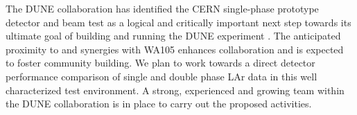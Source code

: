 The DUNE collaboration has identified the CERN single-phase prototype detector and beam test as a logical and critically important next
step towards its ultimate goal of building and running the DUNE experiment \cite{dunecdr}. The anticipated proximity to and synergies with WA105 enhances collaboration and is expected to foster community building. We plan to work towards a direct detector performance comparison of single and double phase LAr data in this well characterized test environment. 
%
A strong, experienced and growing team within the DUNE collaboration is in place to carry out the proposed activities.











